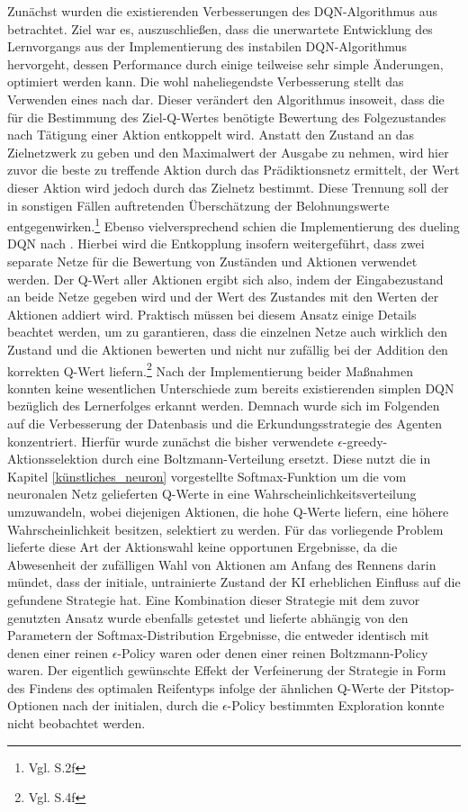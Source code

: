 Zunächst wurden die existierenden Verbesserungen des DQN-Algorithmus aus \cite{rainbow_dqn} betrachtet. Ziel war es, auszuschließen, dass die unerwartete Entwicklung des Lernvorgangs aus der Implementierung des instabilen DQN-Algorithmus hervorgeht, dessen Performance durch einige teilweise sehr simple Änderungen, optimiert werden kann. Die wohl naheliegendste Verbesserung stellt das Verwenden eines  nach \cite{double_q_learning} dar. Dieser verändert den Algorithmus insoweit, dass die für die Bestimmung des Ziel-Q-Wertes benötigte Bewertung des Folgezustandes nach Tätigung einer Aktion entkoppelt wird. Anstatt den Zustand an das Zielnetzwerk zu geben und den Maximalwert der Ausgabe zu nehmen, wird hier zuvor die beste zu treffende Aktion durch das Prädiktionsnetz ermittelt, der Wert dieser Aktion wird jedoch durch das Zielnetz bestimmt. Diese Trennung soll der in sonstigen Fällen auftretenden Überschätzung der Belohnungswerte entgegenwirken.\footnote{Vgl. \cite{double_q_learning} S.2f}
Ebenso vielversprechend schien die Implementierung des dueling DQN nach \cite{dueling_network_architectures}. Hierbei wird die Entkopplung insofern weitergeführt, dass zwei separate Netze für die Bewertung von Zuständen und Aktionen verwendet werden. Der Q-Wert aller Aktionen ergibt sich also, indem der Eingabezustand an beide Netze gegeben wird und der Wert des Zustandes mit den Werten der Aktionen addiert wird. Praktisch müssen bei diesem Ansatz einige Details beachtet werden, um zu garantieren, dass die einzelnen Netze auch wirklich den Zustand und die Aktionen bewerten und nicht nur zufällig bei der Addition den korrekten Q-Wert liefern.\footnote{Vgl. \cite{dueling_network_architectures} S.4f}
Nach der Implementierung beider Maßnahmen konnten keine wesentlichen Unterschiede zum bereits existierenden simplen DQN bezüglich des Lernerfolges erkannt werden. Demnach wurde sich im Folgenden auf die Verbesserung der Datenbasis und die Erkundungsstrategie des Agenten konzentriert. Hierfür wurde zunächst die bisher verwendete \(\epsilon\)-greedy-Aktionsselektion durch eine Boltzmann-Verteilung ersetzt. Diese nutzt die in Kapitel \ref{künstliches_neuron} vorgestellte Softmax-Funktion um die vom neuronalen Netz gelieferten Q-Werte in eine Wahrscheinlichkeitsverteilung umzuwandeln, wobei diejenigen Aktionen, die hohe Q-Werte liefern, eine höhere Wahrscheinlichkeit besitzen, selektiert zu werden. Für das vorliegende Problem lieferte diese Art der Aktionswahl keine opportunen Ergebnisse, da die Abwesenheit der zufälligen Wahl von Aktionen am Anfang des Rennens darin mündet, dass der initiale, untrainierte Zustand der KI erheblichen Einfluss auf die gefundene Strategie hat. Eine Kombination dieser Strategie mit dem zuvor genutzten Ansatz wurde ebenfalls getestet und lieferte abhängig von den Parametern der Softmax-Distribution Ergebnisse, die entweder identisch mit denen einer reinen \(\epsilon\)-Policy waren oder denen einer reinen Boltzmann-Policy waren. Der eigentlich gewünschte Effekt der Verfeinerung der Strategie in Form des Findens des optimalen Reifentyps infolge der ähnlichen Q-Werte der Pitstop-Optionen nach der initialen, durch die \(\epsilon\)-Policy bestimmten Exploration konnte nicht beobachtet werden.\\
